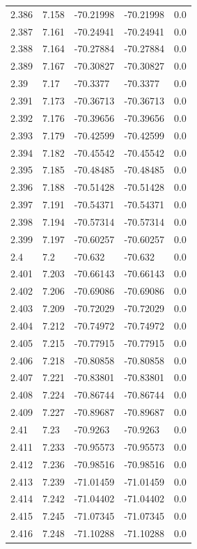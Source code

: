 \begin{tabular}{lllll}
2.386 & 7.158 & -70.21998 & -70.21998 & 0.0 \\
2.387 & 7.161 & -70.24941 & -70.24941 & 0.0 \\
2.388 & 7.164 & -70.27884 & -70.27884 & 0.0 \\
2.389 & 7.167 & -70.30827 & -70.30827 & 0.0 \\
2.39 & 7.17 & -70.3377 & -70.3377 & 0.0 \\
2.391 & 7.173 & -70.36713 & -70.36713 & 0.0 \\
2.392 & 7.176 & -70.39656 & -70.39656 & 0.0 \\
2.393 & 7.179 & -70.42599 & -70.42599 & 0.0 \\
2.394 & 7.182 & -70.45542 & -70.45542 & 0.0 \\
2.395 & 7.185 & -70.48485 & -70.48485 & 0.0 \\
2.396 & 7.188 & -70.51428 & -70.51428 & 0.0 \\
2.397 & 7.191 & -70.54371 & -70.54371 & 0.0 \\
2.398 & 7.194 & -70.57314 & -70.57314 & 0.0 \\
2.399 & 7.197 & -70.60257 & -70.60257 & 0.0 \\
2.4 & 7.2 & -70.632 & -70.632 & 0.0 \\
2.401 & 7.203 & -70.66143 & -70.66143 & 0.0 \\
2.402 & 7.206 & -70.69086 & -70.69086 & 0.0 \\
2.403 & 7.209 & -70.72029 & -70.72029 & 0.0 \\
2.404 & 7.212 & -70.74972 & -70.74972 & 0.0 \\
2.405 & 7.215 & -70.77915 & -70.77915 & 0.0 \\
2.406 & 7.218 & -70.80858 & -70.80858 & 0.0 \\
2.407 & 7.221 & -70.83801 & -70.83801 & 0.0 \\
2.408 & 7.224 & -70.86744 & -70.86744 & 0.0 \\
2.409 & 7.227 & -70.89687 & -70.89687 & 0.0 \\
2.41 & 7.23 & -70.9263 & -70.9263 & 0.0 \\
2.411 & 7.233 & -70.95573 & -70.95573 & 0.0 \\
2.412 & 7.236 & -70.98516 & -70.98516 & 0.0 \\
2.413 & 7.239 & -71.01459 & -71.01459 & 0.0 \\
2.414 & 7.242 & -71.04402 & -71.04402 & 0.0 \\
2.415 & 7.245 & -71.07345 & -71.07345 & 0.0 \\
2.416 & 7.248 & -71.10288 & -71.10288 & 0.0 \\

\end{tabular}
